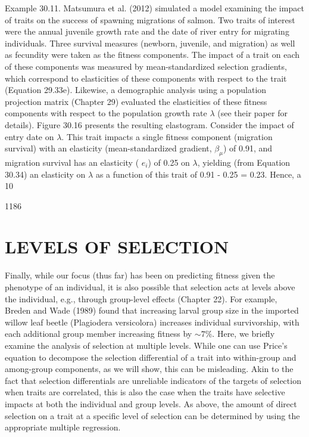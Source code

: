 \documentclass{article}
\begin{document}
Example 30.11. Matsumura et al. (2012) simulated a model examining the impact of traits on the success of spawning migrations of salmon. Two traits of interest were the annual juvenile growth rate and the date of river entry for migrating individuals. Three survival measures (newborn, juvenile, and migration) as well as fecundity were taken as the fitness components. The impact of a trait on each of these components was measured by mean-standardized selection gradients, which correspond to elasticities of these components with respect to the trait (Equation 29.33e). Likewise, a demographic analysis using a population projection matrix (Chapter 29) evaluated the elasticities of these fitness components with respect to the population growth rate  $ \lambda $ (see their paper for details). Figure 30.16 presents the resulting elastogram. Consider the impact of entry date on  $ \lambda $. This trait impacts a single fitness component (migration survival) with an elasticity (mean-standardized gradient,  $ \beta_{\mu} $) of 0.91, and migration survival has an elasticity ( $ e_{i} $) of 0.25 on  $ \lambda $, yielding (from Equation 30.34) an elasticity on  $ \lambda $ as a function of this trait of 0.91 - 0.25 = 0.23. Hence, a 10%

1186

\section{LEVELS OF SELECTION}
Finally, while our focus (thus far) has been on predicting fitness given the phenotype of an individual, it is also possible that selection acts at levels above the individual, e.g., through group-level effects (Chapter 22). For example, Breden and Wade (1989) found that increasing larval group size in the imported willow leaf beetle (Plagiodera versicolora) increases individual survivorship, with each additional group member increasing fitness by  $ \sim7\% $. Here, we briefly examine the analysis of selection at multiple levels. While one can use Price's equation to decompose the selection differential of a trait into within-group and among-group components, as we will show, this can be misleading. Akin to the fact that selection differentials are unreliable indicators of the targets of selection when traits are correlated, this is also the case when the traits have selective impacts at both the individual and group levels. As above, the amount of direct selection on a trait at a specific level of selection can be determined by using the appropriate multiple regression.
\end{document}
